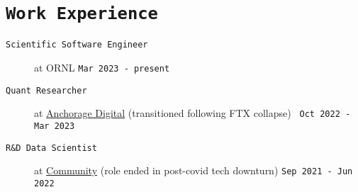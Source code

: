 \documentclass[11pt, letter]{article}
\begin{document}
\section*{\tt Work Experience}
\begin{minipage}{\textwidth}
	\begin{description}
	
	\item[\tt Scientific Software Engineer] at ORNL 
	\hfill {\tt Mar 2023 - present~}
	
	\item[\tt Quant Researcher] at \href{https://www.anchorage.com}{Anchorage Digital} 
	{\scriptsize(transitioned following FTX collapse)}
	\hfill {\tt~Oct 2022 - Mar 2023}
	

	\item[\tt R\&D Data Scientist] at \href{https://www.community.com/about-us}{Community} 
	{\scriptsize(role ended in post-covid tech downturn)}
	\hfill {\tt Sep 2021 - Jun 2022}


\end{description}
\end{minipage}
\end{document}
